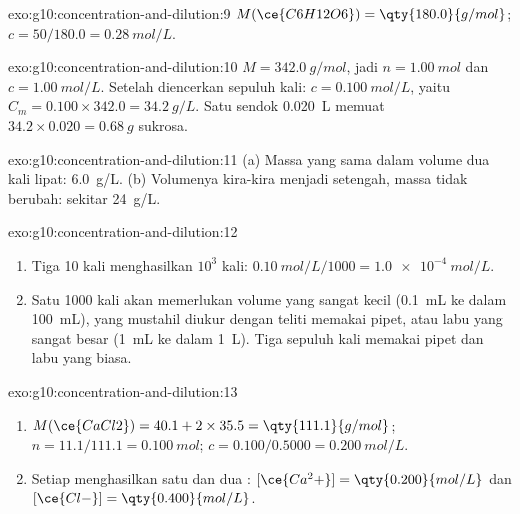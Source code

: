 \begin{solution}{exo:g10:concentration-and-dilution:9}
$M(\ce{C6H12O6}) = \qty{180.0}{g/mol}$; $c = 50 / 180.0 =
\qty{0.28}{mol/L}$.
\end{solution}

\begin{solution}{exo:g10:concentration-and-dilution:10}
$M = \qty{342.0}{g/mol}$, jadi $n = \qty{1.00}{mol}$ dan $c =
\qty{1.00}{mol/L}$. Setelah diencerkan sepuluh kali: $c = \qty{0.100}{mol/L}$, yaitu
$C_m = 0.100 \times 342.0 = \qty{34.2}{g/L}$. Satu sendok
\qty{0.020}{L} memuat $34.2 \times 0.020 = \qty{0.68}{g}$ sukrosa.
\end{solution}

\begin{solution}{exo:g10:concentration-and-dilution:11}
(a) Massa  yang sama dalam volume dua kali lipat:
\qty{6.0}{g/L}. (b) Volumenya kira-kira menjadi setengah, massa  tidak berubah: sekitar \qty{24}{g/L}.
\end{solution}

\begin{solution}{exo:g10:concentration-and-dilution:12}
\begin{enumerate}
  \item Tiga  10 kali menghasilkan  $10^3$ kali:
        $\qty{0.10}{mol/L} / 1000 = \qty{1.0e-4}{mol/L}$.
  \item Satu  1000 kali akan memerlukan volume 
        yang sangat kecil (\qty{0.1}{mL} ke dalam \qty{100}{mL}), yang
        mustahil diukur dengan teliti memakai pipet, atau labu yang sangat
        besar (\qty{1}{mL} ke dalam \qty{1}{L}). Tiga  sepuluh
        kali memakai pipet dan labu yang biasa.
\end{enumerate}
\end{solution}

\begin{solution}{exo:g10:concentration-and-dilution:13}
\begin{enumerate}
  \item $M(\ce{CaCl2}) = 40.1 + 2 \times 35.5 = \qty{111.1}{g/mol}$;
        $n = 11.1 / 111.1 = \qty{0.100}{mol}$; $c = 0.100 / 0.5000 =
        \qty{0.200}{mol/L}$.
  \item Setiap  menghasilkan satu  dan dua :
        $[\ce{Ca^2+}] = \qty{0.200}{mol/L}$ dan $[\ce{Cl-}] =
        \qty{0.400}{mol/L}$.
\end{enumerate}
\end{solution}

